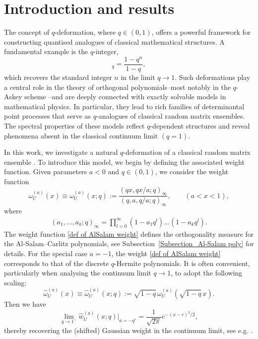 \documentclass{amsart}
\theoremstyle{plain}
\theoremstyle{remark}
\numberwithin{equation}{section}
\begin{document}
\section{Introduction and results}
The concept of \( q \)-deformation, where \( q \in (0,1) \), offers a powerful framework for constructing quantised analogues of classical mathematical structures. A fundamental example is the \( q \)-integer,
\begin{equation} 
[n]_q = \frac{1 - q^n}{1 - q},
\end{equation} 
which recovers the standard integer \( n \) in the limit \( q \to 1 \). Such deformations play a central role in the theory of orthogonal polynomials--most notably in the \( q \)-Askey scheme \cite{As80, KLS10,ISV87}--and are deeply connected with exactly solvable models in mathematical physics. In particular, they lead to rich families of determinantal point processes that serve as \( q \)-analogues of classical random matrix ensembles. The spectral properties of these models reflect \( q \)-dependent structures and reveal phenomena absent in the classical continuum limit \( (q = 1) \).

In this work, we investigate a natural $q$-deformation of a classical random matrix ensemble \cite{Fo10}. To introduce this model, we begin by defining the associated weight function.
Given parameters $a < 0$ and $q \in (0,1)$, we consider the weight function
 \begin{equation} \label{def of AlSalam weight}
\omega_U^{(a)}(x) \equiv \omega_U^{(a)}(x;q) := \frac{ (qx,qx/a;q)_\infty }{ (q,a,q/a;q)_\infty}, \qquad (a<x<1),  
 \end{equation}
where 
\begin{align} 
(a_1,\dots, a_k ; q)_\infty = \prod_{l=0}^\infty (1-a_1 q^l) \dots (1-a_k q^l).
\end{align}
The weight function \eqref{def of AlSalam weight} defines the orthogonality measure for the Al-Salam--Carlitz polynomials, see Subsection~\ref{Subsection_Al-Salam poly} for details.
For the special case $a=-1$, the weight \eqref{def of AlSalam weight} corresponds to that of the discrete $q$-Hermite polynomials.  
It is often convenient, particularly when analysing the continuum limit \( q \to 1 \), to adopt the following scaling:
\begin{equation} \label{def of AlSalam weight hat}
\widehat{\omega}_U^{ (a) } (x) \equiv \widehat{\omega}_U^{ (a) } (x;q) :=  \sqrt{1-q}\,\omega_U^{  (a) } ( \sqrt{1-q}\,x ). 
\end{equation}
Then we have 
\begin{equation} \label{limit of weight q to 1}
\lim_{ q \to 1^- }   \widehat{w}_U^{(a)}(x;q) \Big|_{a=-q^r} = \frac{1}{\sqrt{2\pi}} e^{ -(x-r)^2/2 },
\end{equation}
thereby recovering the (shifted) Gaussian weight in the continuum limit, see e.g. \cite[Eq.~(2.11)]{BF00}. 
\end{document}
